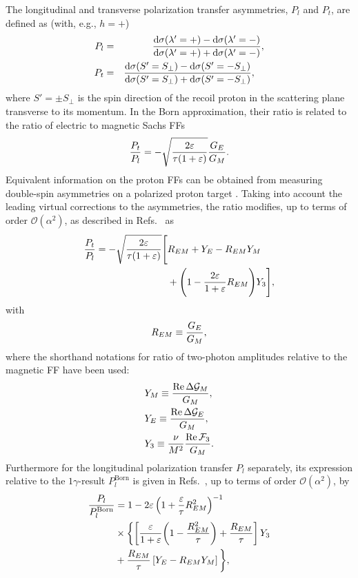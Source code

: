 The longitudinal and transverse polarization transfer asymmetries, $P_l$ and $P_t$, are defined as (with, e.g., $h=+$) 
\begin{eqnarray}
\eqlab{Pl}
P_l&=&\frac{\dd \sigma(\lambda'=+)-\dd \sigma(\lambda'=-)}{\dd \sigma(\lambda'=+)+\dd \sigma(\lambda'=-)},\\
P_t&=&\frac{\dd \sigma(S'=S_\perp)-\dd \sigma(S'=-S_\perp)}{\dd \sigma(S'=S_\perp)+\dd \sigma(S'=-S_\perp)},\quad
\eqlab{Pt}
\end{eqnarray}
where $S'=\pm S_\perp$ is the spin direction of the recoil proton in the scattering plane transverse to its momentum.
In the Born approximation, their ratio is related to
the ratio of electric to magnetic 
Sachs FFs \cite{Akhiezer:1968ek,Akhiezer:1974em}
\begin{eqnarray}
\eqlab{PTOPE}
\frac{P_t}{P_l}=-\sqrt{\frac{2\varepsilon}{\tau (1+\varepsilon)}} \frac{G_E}{G_M}.
\end{eqnarray}
Equivalent information on the proton FFs can be obtained from measuring double-spin asymmetries on a polarized proton target \cite{Dombey1969}. Taking into account the leading virtual corrections to the asymmetries, the ratio modifies, up to terms of order $\mathcal{O}(\alpha^2)$, as described in Refs.~\cite{Guichon:2003qm,Guttmann:2010au,Meziane:2010xc} as
\begin{align}
\label{PtPlradcorr}
\frac{P_t}{P_l}=-\sqrt{\frac{2\varepsilon}{\tau (1+\varepsilon)}} \Bigg[&R_{EM} +Y_E - R_{EM} Y_M \nonumber\\&  +\Bigg (1-\frac{2 \varepsilon}{1+\varepsilon} R_{EM} \Bigg )Y_3 \Bigg],
\end{align}
with
\begin{align}
R_{EM} \equiv \frac{G_E}{G_M},
\eqlab{REM}
\end{align}
where the shorthand notations for ratio of two-photon amplitudes relative to the magnetic FF have been used: 
\begin{align}
&Y_M \equiv \frac{\operatorname{Re} \Delta {\cal G}_M }{G_M}, \\ 
&Y_E \equiv \frac{\operatorname{Re} \Delta {\cal G}_E }{G_M}, \\ 
&Y_3 \equiv \frac{\nu}{M^2}\frac{\operatorname{Re} {\cal F}_3}{G_M}.
\label{eq:2gaampl}
\end{align}
Furthermore for the longitudinal polarization transfer $P_l$ separately, its expression relative to the $1 \gamma$-result $P_l^\text{Born}$ 
is given in Refs.~\cite{Guichon:2003qm,Guttmann:2010au}, up to terms of order $\mathcal{O}(\alpha^2)$, by
\begin{eqnarray}
\frac{P_l}{P_l^\text{Born}}  & =    1 - 2 \varepsilon 
\left( 1 + \frac{\varepsilon}{\tau} R_{EM}^2  \right)^{-1} 
\nonumber \\
&\times \left\{ 
\left[ \frac{\varepsilon}{1 + \varepsilon} \bigg( 1 - \frac{R_{EM}^2}{\tau}  \right) 
+ \frac{R_{EM}}{\tau}  \right] Y_3 
\nonumber \\ 
&+  \frac{R_{EM}}{\tau} \left[  Y_E  - R_{EM} Y_M \right]  \bigg\},  	\label{pl_2gamma}  
\end{eqnarray}
